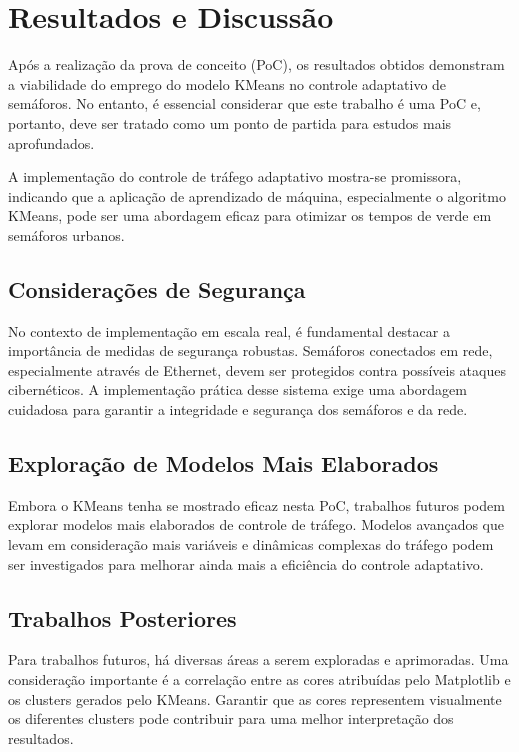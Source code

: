 \documentclass[a4paper, 10pt, conference]{IEEEtran}
\begin{document}
\section{Resultados e Discussão}

Após a realização da prova de conceito (PoC), os resultados obtidos demonstram a viabilidade do emprego do modelo KMeans no controle adaptativo de semáforos. No entanto, é essencial considerar que este trabalho é uma PoC e, portanto, deve ser tratado como um ponto de partida para estudos mais aprofundados.

A implementação do controle de tráfego adaptativo mostra-se promissora, indicando que a aplicação de aprendizado de máquina, especialmente o algoritmo KMeans, pode ser uma abordagem eficaz para otimizar os tempos de verde em semáforos urbanos.

\subsection{Considerações de Segurança}

No contexto de implementação em escala real, é fundamental destacar a importância de medidas de segurança robustas. Semáforos conectados em rede, especialmente através de Ethernet, devem ser protegidos contra possíveis ataques cibernéticos. A implementação prática desse sistema exige uma abordagem cuidadosa para garantir a integridade e segurança dos semáforos e da rede.

\subsection{Exploração de Modelos Mais Elaborados}

Embora o KMeans tenha se mostrado eficaz nesta PoC, trabalhos futuros podem explorar modelos mais elaborados de controle de tráfego. Modelos avançados que levam em consideração mais variáveis e dinâmicas complexas do tráfego podem ser investigados para melhorar ainda mais a eficiência do controle adaptativo.

\subsection{Trabalhos Posteriores}

Para trabalhos futuros, há diversas áreas a serem exploradas e aprimoradas. Uma consideração importante é a correlação entre as cores atribuídas pelo Matplotlib e os clusters gerados pelo KMeans. Garantir que as cores representem visualmente os diferentes clusters pode contribuir para uma melhor interpretação dos resultados.
\end{document}
